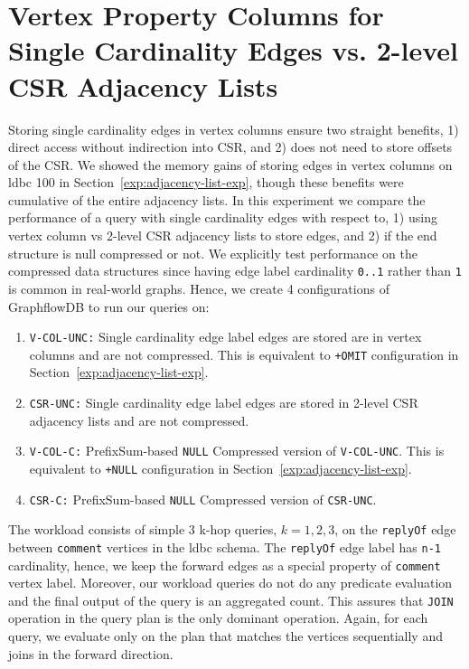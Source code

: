\section{Vertex Property Columns for Single Cardinality Edges vs. 2-level CSR Adjacency Lists}
\label{exp:single-cardinality}

Storing single cardinality edges in vertex columns ensure two straight benefits, 1) direct access without indirection into CSR, and 2) does not need to store offsets of the CSR. We showed the memory gains of storing edges in vertex columns on \gls{ldbc} 100 in Section~\ref{exp:adjacency-list-exp}, though these benefits were cumulative of the entire adjacency lists. In this experiment we compare the performance of a query with single cardinality edges with respect to, 1) using vertex column vs 2-level CSR adjacency lists to store edges, and 2) if the end structure is null compressed or not. We explicitly test performance on the compressed data structures since having edge label cardinality \texttt{0..1} rather than \texttt{1} is common in real-world graphs. Hence, we create 4 configurations of GraphflowDB to run our queries on:

\begin{enumerate}
	\item \texttt{V-COL-UNC:} Single cardinality edge label edges are stored are in vertex columns and are not compressed. This is equivalent to \texttt{+OMIT} configuration in Section~\ref{exp:adjacency-list-exp}.
	\item \texttt{CSR-UNC:} Single cardinality edge label edges are stored in 2-level CSR adjacency lists and are not compressed.
	\item \texttt{V-COL-C:} PrefixSum-based \texttt{NULL} Compressed version of \texttt{V-COL-UNC}. This is equivalent to \texttt{+NULL} configuration in Section~\ref{exp:adjacency-list-exp}.
	\item \texttt{CSR-C:} PrefixSum-based \texttt{NULL} Compressed version of \texttt{CSR-UNC}.
\end{enumerate}

The workload consists of simple 3 k-hop queries, $k=1,2,3$, on the \texttt{replyOf} edge between \texttt{comment} vertices in the \gls{ldbc} schema. The \texttt{replyOf} edge label has \texttt{n-1} cardinality, hence, we keep the forward edges as a special property of \texttt{comment} vertex label. Moreover, our workload queries do not do any predicate evaluation and the final output of the query is an aggregated count. This assures that \texttt{JOIN} operation in the query plan is the only dominant operation. Again, for each query, we evaluate only on the plan that matches the vertices sequentially and joins in the forward direction.

